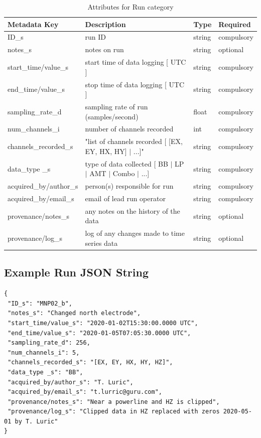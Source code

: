 \documentclass{article}
\begin{document}
\begin{table}[htb!]
	\caption[Attributes for Run]{Attributes for Run category}
	\begin{tabular}{|l|p{3in}|l|l|}
		\hline
		\textbf{Metadata Key} & \textbf{Description} & \textbf{Type} & \textbf{Required} \\ \hline
		ID\_s & run ID & string & compulsory \\ \hline
		notes\_s & notes on run & string & optional \\ \hline
		start\_time/value\_s & start time of data logging [ UTC ] & string & compulsory \\ \hline
		end\_time/value\_s & stop time of data logging [ UTC ] & string & compulsory \\ \hline
		sampling\_rate\_d & sampling rate of run (samples/second) & float & compulsory \\ \hline
		num\_channels\_i & number of channels recorded & int & compulsory \\ \hline
		channels\_recorded\_s & "list of channels recorded [ [EX, EY, HX, HY] $|$ ...]" & string & compulsory \\ \hline
		data\_type \_s & type of data collected [ BB $|$ LP $|$ AMT $|$ Combo $|$ ...] & string & compulsory \\ \hline
		acquired\_by/author\_s & person(s) responsible for run & string & compulsory \\ \hline
		acquired\_by/email\_s & email of lead run operator & string & compulsory \\ \hline
		provenance/notes\_s & any notes on the history of the data & string & optional \\ \hline
		provenance/log\_s & log of any changes made to time series data & string & optional \\ \hline
	\end{tabular}
	\label{tab:run}
\end{table}

\subsection{Example Run JSON String}

\begin{verbatim}
{
 "ID_s": "MNP02_b",
 "notes_s": "Changed north electrode",
 "start_time/value_s": "2020-01-02T15:30:00.0000 UTC",
 "end_time/value_s": "2020-01-05T07:05:30.0000 UTC",
 "sampling_rate_d": 256,
 "num_channels_i": 5,
 "channels_recorded_s": "[EX, EY, HX, HY, HZ]",
 "data_type _s": "BB",
 "acquired_by/author_s": "T. Luric",
 "acquired_by/email_s": "t.lurric@guru.com",
 "provenance/notes_s": "Near a powerline and HZ is clipped",
 "provenance/log_s": "Clipped data in HZ replaced with zeros 2020-05-01 by T. Luric"
}
\end{verbatim}
\end{document}
